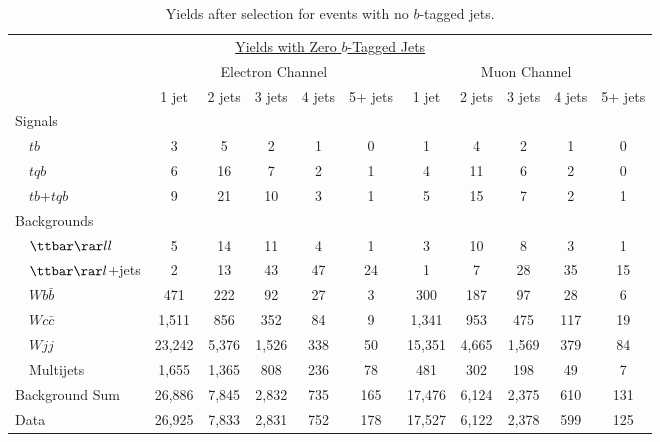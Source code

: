 \begin{table}[!h!tbp]
\begin{center}
\begin{minipage}{6.5in}
\begin{ruledtabular}
\begin{tabular}{l||ccccc|ccccc}
\multicolumn{11}{c}{\hspace{1in}\underline{Yields with Zero $b$-Tagged Jets}} \vspace{0.1in} \\
& \multicolumn{5}{c|}{Electron Channel} & \multicolumn{5}{c}{Muon Channel} \\
                         & 1 jet & 2 jets & 3 jets & 4 jets & 5+ jets
                         & 1 jet & 2 jets & 3 jets & 4 jets & 5+ jets \\
\hline
\hline
Signals                  &        &       &       &       &      &        &       &       &      &       \\
~~$tb$                   &      3 &     5 &     2 &     1 &    0 &     1 &     4 &     2 &     1 &     0 \\
~~$tqb$                  &      6 &    16 &     7 &     2 &    1 &     4 &    11 &     6 &     2 &     0 \\
~~$tb$+$tqb$             &      9 &    21 &    10 &     3 &    1 &     5 &    15 &     7 &     2 &     1 \\
Backgrounds              &         &       &       &       &      &        &       &       &      &      \\
~~${\ttbar}{\rar}ll$     &      5 &    14 &    11 &     4 &    1 &     3 &    10 &     8 &     3 &     1 \\
~~${\ttbar}{\rar}l$+jets &      2 &    13 &    43 &    47 &   24 &     1 &     7 &    28 &    35 &    15 \\
~~$Wb\bar{b}$            &    471 &   222 &    92 &    27 &    3 &   300 &   187 &    97 &    28 &     6 \\
~~$Wc\bar{c}$            &  1,511 &   856 &   352 &    84 &    9 & 1,341 &   953 &   475 &   117 &    19 \\
~~$Wjj$                  & 23,242 & 5,376 & 1,526 &   338 &   50 &15,351 & 4,665 & 1,569 &   379 &    84 \\
~~Multijets              &  1,655 & 1,365 &   808 &   236 &   78 &   481 &   302 &   198 &    49 &     7 \\
\hline
Background Sum           & 26,886 & 7,845 & 2,832 &   735 &  165 &17,476 & 6,124 & 2,375 &   610 &   131 \\
\hline
Data                     & 26,925 & 7,833 & 2,831 &   752 &  178 &17,527 & 6,122 & 2,378 &   599 &   125
\end{tabular}
\end{ruledtabular}
\vspace{-0.1in}
\caption[zerotagyields]{Yields after selection for events with no $b$-tagged jets.}
\label{zerotag-yields}
\end{minipage}
\end{center}
\end{table}

